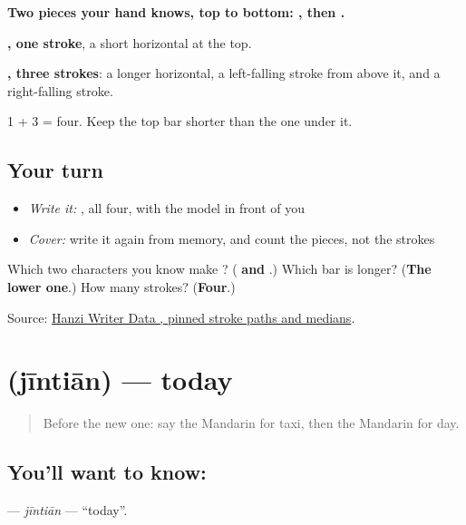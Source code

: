 \begin{quote}
\end{quote}

\textbf{Two pieces your hand knows, top to bottom: , then .}

\textbf{, one stroke}, a short horizontal at the top.

\textbf{, three strokes}: a longer horizontal, a left-falling stroke from above it, and a right-falling stroke.

1 + 3 = four. Keep the top bar shorter than the one under it.

\subsection*{Your turn}
\begin{itemize}
\raggedright
  \item \emph{Write it:} , all four, with the model in front of you
  \item \emph{Cover:} write it again from memory, and count the pieces, not the strokes
\end{itemize}

\begin{tcolorbox}[breakable,colback=teal!4,colframe=teal!35!black,title={Before you move on}]
Which two characters you know make ? (\textbf{ and }.) Which bar is longer? (\textbf{The lower one}.) How many strokes? (\textbf{Four}.)

Source: \href{https://raw.githubusercontent.com/chanind/hanzi-writer-data/68d10a4b21150cae5e1ebbd223eed289cf32d90c/data/\%E5\%A4\%A9.json}{Hanzi Writer Data , pinned stroke paths and medians}.
\end{tcolorbox}
\section[\texorpdfstring{\zh{今天} (jīntiān)}{今天 (jīntiān)}]{ (jīntiān) — today}

\label{lesson:ZH-C45-jintian}



\begin{quote}
Before the new one: say the Mandarin for taxi, then the Mandarin for day.
\end{quote}

\subsection*{You'll want to know: }
\textbf{} — \emph{jīntiān} — \textquotedblleft{}today\textquotedblright{}.

